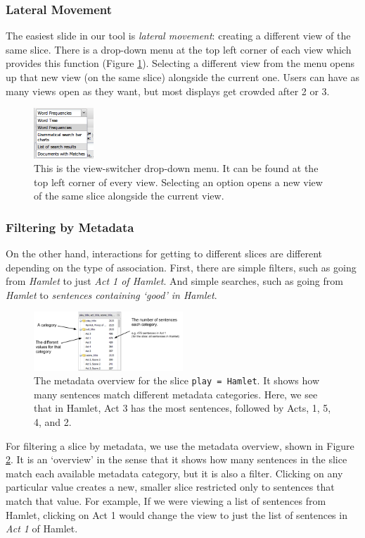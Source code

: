 \documentclass{sig-alternate}
\newcommand{\code}[1] {\texttt{#1}}
\begin{document}
\subsubsection{Lateral Movement}
The easiest slide in our tool is \emph{lateral movement}: creating a different view of the same slice.  There is a drop-down menu at the top left corner of each view which provides this function (Figure \ref{fig:chris03}).  Selecting a different view from the menu opens up that new view (on the same slice) alongside the current one. Users can have as many views open as they want, but most displays get crowded after 2 or 3.  
\begin{figure}[h!]
\includegraphics[width=0.2\textwidth]{fig/chris/03.png}
\caption{ This is the view-switcher drop-down menu. It can be found at the top left corner of every view. Selecting an option opens a new view  of the same slice alongside the current view. \label{fig:chris03}}
\end{figure}

\subsubsection{Filtering by Metadata}
On the other hand, interactions for getting to different slices are different depending on the type of association. First, there are simple filters, such as going from \emph{Hamlet} to just \emph{Act 1 of Hamlet}. And simple searches, such as going from \emph{Hamlet} to \emph{sentences containing `good' in Hamlet}.
  
\begin{figure}
\includegraphics[width=0.5\textwidth]{fig/sliding/02-metadata-categories.png}
\caption{The metadata overview for the slice \code{play = Hamlet}.  It shows how many sentences match different metadata categories. Here, we see that in Hamlet, Act 3 has the most sentences, followed by Acts, 1, 5, 4, and 2. \label{fig:metadata-categories}}
\end{figure}
For filtering a slice by metadata, we use the metadata overview, shown in Figure \ref{fig:metadata-categories}. It is an `overview' in the sense that it shows how many sentences in the slice match each available metadata category, but it is also a filter. Clicking on any particular value creates a new, smaller slice restricted only to sentences that match that value. For example, If we were viewing a list of sentences from Hamlet,  clicking on Act 1 would change the view to just the list of sentences in \emph{Act 1} of Hamlet.
\end{document}
